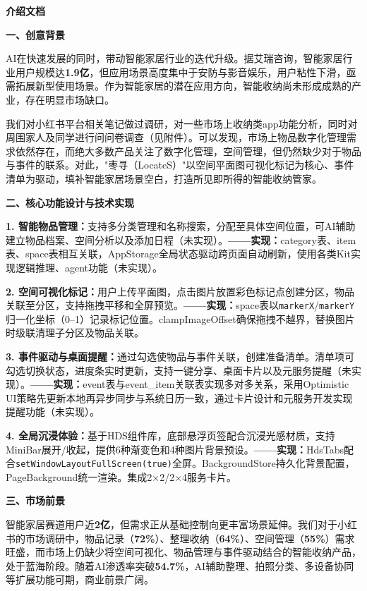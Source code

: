 \documentclass[UTF8,zihao=5,twoside]{ctexart}
\newcommand{\blankline}{\vspace{\baselineskip}\par}
\newcommand{\secondheading}[1]{{\noindent\zihao{4}\bfseries #1\par}}
\newcommand{\thirdheading}[1]{{\noindent\zihao{-4}\bfseries #1\par}}
\begin{document}
\blankline

\secondheading{介绍文档}

\blankline

\thirdheading{一、创意背景}

AI在快速发展的同时，带动智能家居行业的迭代升级。据艾瑞咨询，智能家居行业用户规模达\textbf{1.9亿}，但应用场景高度集中于安防与影音娱乐，用户粘性下滑，亟需拓展新型使用场景。作为智能家居的潜在应用方向，智能收纳尚未形成成熟的产业，存在明显市场缺口。

我们对小红书平台相关笔记做过调研，对一些市场上收纳类app功能分析，同时对周围家人及同学进行问问卷调查（见附件）。可以发现，市场上物品数字化管理需求依然存在，而绝大多数产品关注了数字化管理，空间管理，但仍然缺少对于物品与事件的联系。对此，"枣寻（LocateS）"以空间平面图可视化标记为核心、事件清单为驱动，填补智能家居场景空白，打造所见即所得的智能收纳管家。

\thirdheading{二、核心功能设计与技术实现}

\textbf{1. 智能物品管理：}支持多分类管理和名称搜索，分配至具体空间位置，可AI辅助建立物品档案、空间分析以及添加日程（未实现）。\textbf{——实现：}category表、item表、space表相互关联，AppStorage全局状态驱动跨页面自动刷新，使用各类Kit实现逻辑推理、agent功能（未实现）。

\textbf{2. 空间可视化标记：}用户上传平面图，点击图片放置彩色标记点创建分区，物品关联至分区，支持拖拽平移和全屏预览。\textbf{——实现：}space表以\verb|markerX|/\verb|markerY|归一化坐标（0–1）记录标记位置。clampImageOffset确保拖拽不越界，替换图片时级联清理子分区及物品关联。

\textbf{3. 事件驱动与桌面提醒：}通过勾选使物品与事件关联，创建准备清单。清单项可勾选切换状态，进度条实时更新，支持一键分享、桌面卡片以及元服务提醒（未实现）。\textbf{——实现：}event表与event\_item关联表实现多对多关系，采用Optimistic UI策略先更新本地再异步同步与系统日历一致，通过卡片设计和元服务开发实现提醒功能（未实现）。

\textbf{4. 全局沉浸体验：}基于HDS组件库，底部悬浮页签配合沉浸光感材质，支持MiniBar展开/收起，提供6种渐变色和4种图片背景预设。\textbf{——实现：}HdsTabs配合\verb|setWindowLayoutFullScreen(true)|全屏。BackgroundStore持久化背景配置，PageBackground统一渲染。集成2×2/2×4服务卡片。

\thirdheading{三、市场前景}

智能家居赛道用户近\textbf{2亿}，但需求正从基础控制向更丰富场景延伸。我们对于小红书的市场调研中，物品记录（\textbf{72\%}）、整理收纳（\textbf{64\%}）、空间管理（\textbf{55\%}）需求旺盛，而市场上仍缺少将空间可视化、物品管理与事件驱动结合的智能收纳产品，处于蓝海阶段。随着AI渗透率突破\textbf{54.7\%}，AI辅助整理、拍照分类、多设备协同等扩展功能可期，商业前景广阔。
\end{document}
